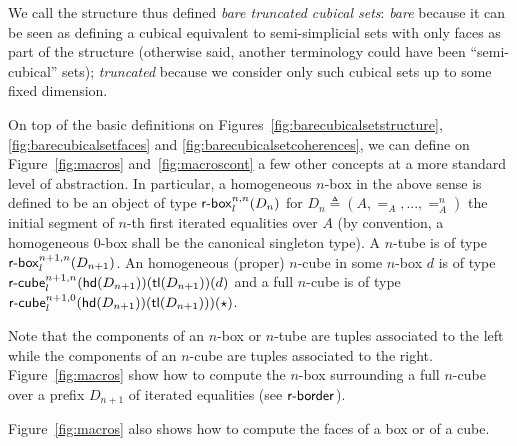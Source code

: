 \documentclass{article}
\newcommand{\defeq}{\triangleq}
\begin{document}
We call the structure thus defined {\em bare truncated cubical sets}:
{\em bare} because it can be seen as defining a cubical equivalent to
semi-simplicial sets with only faces as part of the structure
(otherwise said, another terminology could have been ``semi-cubical''
sets); {\em truncated} because we consider only such cubical sets up
to some fixed dimension.

On top of the basic definitions on
Figures~\ref{fig:barecubicalsetstructure},
\ref{fig:barecubicalsetfaces} and \ref{fig:barecubicalsetcoherences},
we can define on Figure~\ref{fig:macros} and~\ref{fig:macroscont} a few other concepts at a
more standard level of abstraction. In particular, a homogeneous
$n$-box in the above sense is defined to be an object of type
$\mathsf{r\mbox{-}box}_{l}^{n,n}(D_{n})$ for $D_{n} \defeq (A,=_A,...,=^n_A)$ the initial
segment of $n$-th first iterated equalities over $A$ (by convention, a
homogeneous $0$-box shall be the canonical singleton type). A $n$-tube
is of type $\mathsf{r\mbox{-}box}_{l}^{n+1,n}(D_{n+1})$. An homogeneous (proper) $n$-cube
in some $n$-box $d$ is of type $\mathsf{r\mbox{-}cube}_{l}^{n+1,n}(\mathsf{hd}(D_{n+1}))(\mathsf{tl}(D_{n+1}))(d)$ and a
full $n$-cube is of type $\mathsf{r\mbox{-}cube}_{l}^{n+1,0}(\mathsf{hd}(D_{n+1}))(\mathsf{tl}(D_{n+1})))(\star)$.

Note that the components of an $n$-box or $n$-tube are tuples
associated to the left while the components of an $n$-cube are tuples
associated to the right. Figure~\ref{fig:macros} show how to compute
the $n$-box surrounding a full $n$-cube over a prefix $D_{n+1}$ of
iterated equalities (see $\mathsf{r\mbox{-}border}_{}$).

Figure~\ref{fig:macros} also shows how to compute the faces of a box or of a cube.
\end{document}

